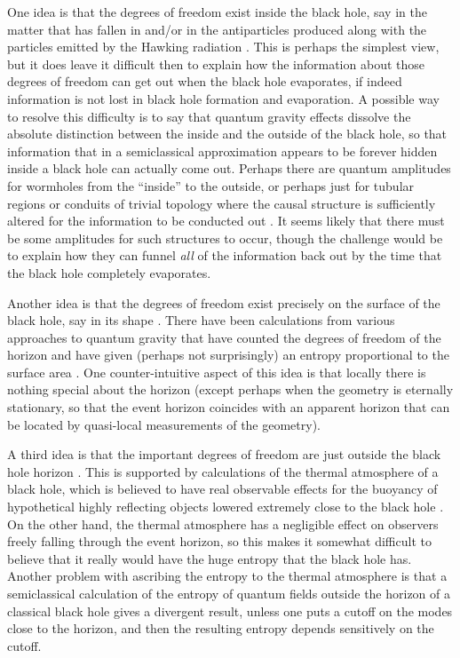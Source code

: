 \documentclass[12pt]{article} \usepackage{latexsym} \textwidth 15cm
\begin{document}
One idea is that the degrees of freedom exist inside the black hole,
say in the matter that has fallen in and/or in the antiparticles
produced along with the particles emitted by the Hawking radiation
\cite{FN,BFZ}.  This is perhaps the simplest view, but it does leave
it difficult then to explain how the information about those degrees
of freedom can get out when the black hole evaporates, if indeed
information is not lost in black hole formation and evaporation.  A
possible way to resolve this difficulty is to say that quantum gravity
effects dissolve the absolute distinction between the inside and the
outside of the black hole, so that information that in a semiclassical
approximation appears to be forever hidden inside a black hole can
actually come out.  Perhaps there are quantum amplitudes for wormholes
from the ``inside'' to the outside, or perhaps just for tubular
regions or conduits of trivial topology where the causal structure is
sufficiently altered for the information to be conducted out
\cite{Pagereview}.  It seems likely that there must be some amplitudes
for such structures to occur, though the challenge would be to explain
how they can funnel {\it all} of the information back out by the time
that the black hole completely evaporates.

Another idea is that the degrees of freedom exist precisely on the
surface of the black hole, say in its shape \cite{Sor1,Sor3}.  There
have been calculations from various approaches to quantum gravity that
have counted the degrees of freedom of the horizon and have given
(perhaps not surprisingly) an entropy proportional to the surface area
\cite{Car95,Rovelli,Teitelboim,Car97,Rovelli2,Rovelli3,ABCK,AK,Car99,Car02}.
One counter-intuitive aspect of this idea is that locally there is
nothing special about the horizon (except perhaps when the geometry is
eternally stationary, so that the event horizon coincides with an
apparent horizon that can be located by quasi-local measurements of
the geometry).

A third idea is that the important degrees of freedom are just outside
the black hole horizon \cite{tHooft,BKLS,MI}.  This is supported by
calculations of the thermal atmosphere of a black hole, which is
believed to have real observable effects for the buoyancy of
hypothetical highly reflecting objects lowered extremely close to the
black hole \cite{UW}.  On the other hand, the thermal atmosphere has a
negligible effect on observers freely falling through the event
horizon, so this makes it somewhat difficult to believe that it really
would have the huge entropy that the black hole has.  Another problem
with ascribing the entropy to the thermal atmosphere is that a
semiclassical calculation of the entropy of quantum fields outside the
horizon of a classical black hole gives a divergent result, unless one
puts a cutoff on the modes close to the horizon, and then the
resulting entropy depends sensitively on the cutoff.
\end{document}
